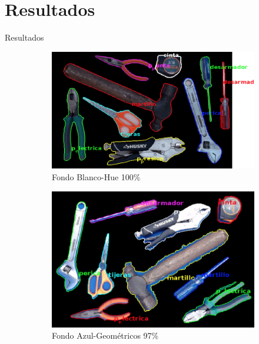 \documentclass[
  24pt, %
]{beamer}
\begin{document}
\section{Resultados}
\begin{frame}{Resultados}

  \begin{figure}[h]
  \centering
  \begin{subfigure}{0.4\linewidth}
    \includegraphics[width=\linewidth]{resultados_colores/resultado_claro_hue_1}
    \caption{Fondo Blanco-Hue 100\%}
  \end{subfigure}
  \begin{subfigure}{0.4\linewidth}
    \includegraphics[width=\linewidth]{resultados_colores/resultado_azul_geom_0_97}
    \caption{Fondo Azul-Geométricos 97\%}
  \end{subfigure}
  \begin{subfigure}{0.4\linewidth}

\end{subfigure}
\end{figure}
\end{frame}
\end{document}
